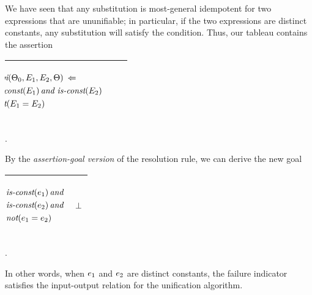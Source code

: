 \documentclass[runningheads]{llncs}
\DeclareMathOperator{\uand}{\emph{and}\,}
\DeclareMathOperator{\unot}{\emph{not}\kern-.0pt}
\DeclareMathOperator{\uimpliedby}{\Leftarrow}
\DeclareMathOperator{\iscnst}{\emph{is-const}}
\DeclareMathOperator{\mgi}{\emph{mgi}}
\begin{document}
\noindent We have seen that any substitution is most-general idempotent for two expressions that are ununifiable;  in particular, if the two expressions are distinct constants, any substitution will satisfy the condition.   Thus,  our tableau contains the assertion
\begin{center}
\begin{tabular}{|m{}|m{}||m{}|}
 \hline 
 \vspace{-1cm}
 \hspace{-3cm}
 \begin{center}
 \hspace{-3cm}
 {\begin{align*}  \hspace{-.7cm}
{\begin{aligned} 
 &\,{\mgi}(\Thet{0}, \E{1}, \E{2}, \Theta) \,\, \uimpliedby \,\, \\
 &\iscnst(\E{1}) \uand \iscnst(\E{2}) \\
 &\unot (\E{1} = \E{2})
 \end{aligned}}
\end{align*}}
\end{center} 
& & \\
\hline
\end{tabular}.
\end{center}
\noindent By the \emph{assertion-goal version} of the resolution rule, we can derive the new goal 
  \begin{center}
\begin{tabular}{T}
  \hline 
  
 & \begin{center}
{\begin{align*} \hspace{-.7cm}
 \begin{aligned}
&\iscnst(\e{1}) \uand \\ &\iscnst(\e{2}) \uand \\ &\unot(\e{1} = \e{2})
 \end{aligned}
\end{align*}}
\end{center}
 &  \begin{center}$\bot$ \end{center} \\
\hline
\end{tabular}.
\end{center}


\noindent In other words, when $e_{1}$ and $e_{2}$ are distinct constants, the failure indicator satisfies the input-output relation for the unification algorithm.
\end{document}
